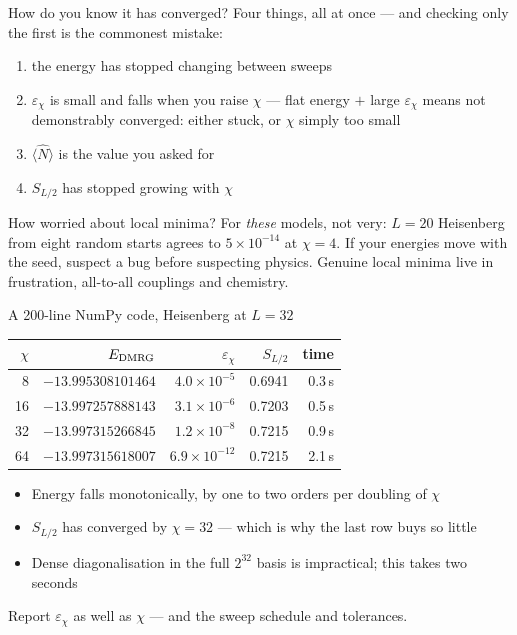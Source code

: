 \documentclass[aspectratio=169,10pt]{beamer}
\newcommand{\numbox}[1]{%
  \begin{tcolorbox}[colback=palegreen,colframe=teal!70!black,title={\bfseries Measured}]
  #1
  \end{tcolorbox}}
\begin{document}
\begin{frame}{How do you know it has converged?}
  Four things, all at once --- and checking only the first is the commonest mistake:
  \begin{enumerate}
    \item the energy has stopped changing between sweeps
    \item $\varepsilon_\chi$ is small \alert{and falls when you raise $\chi$} --- flat energy $+$ large
          $\varepsilon_\chi$ means \alert{not demonstrably converged}: either stuck, or $\chi$ simply too small
    \item $\langle\hat N\rangle$ is the value you asked for
    \item $S_{L/2}$ has stopped growing with $\chi$
  \end{enumerate}
  \vspace{0.4em}
  \numbox{How worried about local minima? For \emph{these} models, not very: $L=20$ Heisenberg from eight random starts agrees to $5\times10^{-14}$ at $\chi=4$. If your energies move with the seed, suspect a \alert{bug} before suspecting physics. Genuine local minima live in frustration, all-to-all couplings and chemistry.}
\end{frame}

\begin{frame}{A 200-line NumPy code, Heisenberg at $L=32$}
  \begin{center}\small
  \begin{tabular}{@{}rrrrr@{}}\toprule
  $\chi$ & $E_{\rm DMRG}$ & $\varepsilon_\chi$ & $S_{L/2}$ & time\\\midrule
  8 & $-13.995308101464$ & $4.0\times10^{-5}$ & 0.6941 & 0.3\,s\\
  16 & $-13.997257888143$ & $3.1\times10^{-6}$ & 0.7203 & 0.5\,s\\
  32 & $-13.997315266845$ & $1.2\times10^{-8}$ & 0.7215 & 0.9\,s\\
  64 & $-13.997315618007$ & $6.9\times10^{-12}$ & 0.7215 & 2.1\,s\\\bottomrule
  \end{tabular}
  \end{center}
  \begin{itemize}
    \item Energy falls monotonically, by one to two orders per doubling of $\chi$
    \item $S_{L/2}$ has converged by $\chi=32$ --- which is why the last row buys so little
    \item Dense diagonalisation in the full $2^{32}$ basis is impractical; this takes two seconds
  \end{itemize}
  \centering\alert{Report $\varepsilon_\chi$ as well as $\chi$} --- and the sweep schedule and tolerances.
\end{frame}
\end{document}
